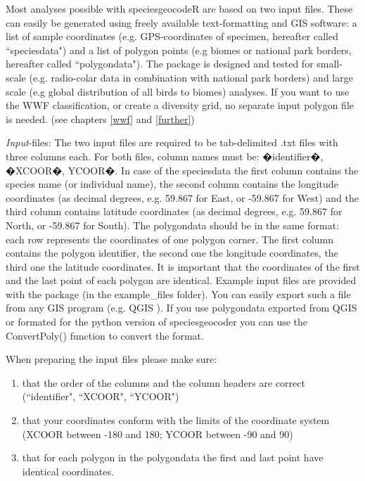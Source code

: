 \documentclass[a4paper,titlepage,11pt]{scrreprt}
\begin{document}
Most analyses possible with speciesgeocodeR are based on two input files. These can easily be generated using freely available text-formatting and GIS software: a list of sample coordinates (e.g. GPS-coordinates of specimen, hereafter called ``speciesdata") and a list of polygon points (e.g biomes or national park borders, hereafter called ``polygondata"). The package is designed and tested for small-scale (e.g. radio-colar data in combination with national park borders) and large scale (e.g global distribution of all birds to biomes) analyses. If you want to use the WWF classification, or create a diversity grid, no separate input polygon file is needed. (see chapters \ref{wwf} and \ref{further})

\textit{Input}-files: The two input files are required to be tab-delimited .txt files with three columns each. For both files, column names must be: �identifier�, �XCOOR�, YCOOR�. In case of the speciesdata the first column contains the species name (or individual name), the second column contains the longitude coordinates (as decimal degrees, e.g. 59.867 for East, or -59.867 for West) and the third column contains latitude coordinates (as decimal degrees, e.g. 59.867 for North, or -59.867 for South). The polygondata should be in the same format: each row represents the coordinates of one polygon corner. The first column contains the polygon identifier, the second one the longitude coordinates, the third one the latitude coordinates. It is important that the coordinates of the first and the last point of each polygon are identical. Example input files are provided with the package (in the example\_files folder). You can easily export such a file from any GIS program (e.g. QGIS \citealt{qgis}). If you use  polygondata exported from QGIS or formated for the python version of speciesgeocoder you can use the ConvertPoly() function to convert the format.

When preparing the input files please make sure:
\begin{enumerate}
\item that the order of the columns and the column headers are correct (``identifier", ``XCOOR", ``YCOOR")
\item that your coordinates conform with the limits of the coordinate system (XCOOR between -180 and 180; YCOOR between -90 and 90)
\item that for each polygon in the polygondata the first and last point have identical coordinates.
\end{enumerate}
\end{document}
